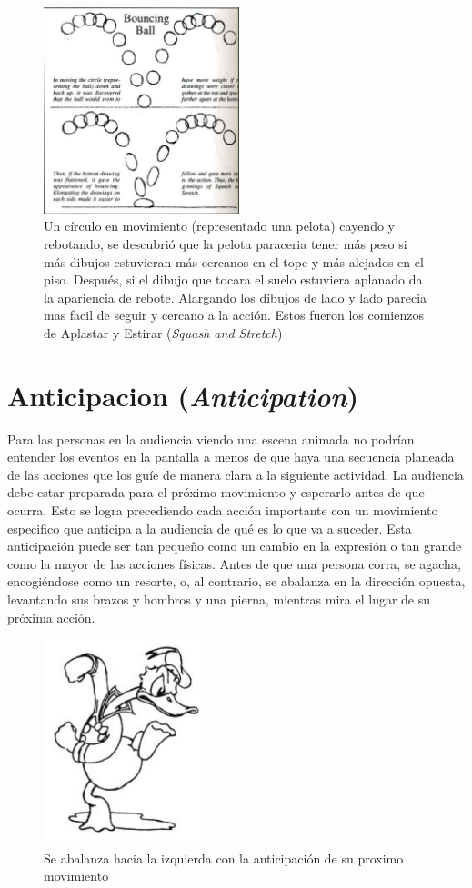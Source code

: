 \documentclass[a4paper,12pt]{report}
\begin{document}
 
\begin{figure}[ht]
    \centering
    \includegraphics[height=6cm]{Imagenes/bouncing_ball}
    \caption{Un círculo en movimiento (representado una pelota) cayendo y rebotando, se descubrió que la pelota paraceria
    tener más peso si más dibujos estuvieran más cercanos en el tope y más alejados en el piso. Después, si el dibujo que tocara el suelo estuviera aplanado
    da la apariencia de rebote. Alargando los dibujos de lado y lado parecia mas facil de seguir y cercano a la acción. Estos fueron los comienzos de
    Aplastar y Estirar (\textit{Squash and Stretch})}
    \label{fig:bouncy_ball}
\end{figure}
 
 
\section{Anticipacion (\textit{Anticipation}) }
 
 
Para las personas en la audiencia viendo una escena animada no podrían entender los eventos en la pantalla
a menos de que haya una secuencia planeada de las acciones que los guíe de manera clara a la siguiente actividad.
La audiencia debe estar preparada para el próximo movimiento y esperarlo antes de que ocurra. Esto se logra
precediendo cada acción importante con un movimiento especifico que anticipa a la audiencia
de qué es lo que va a suceder. Esta anticipación puede ser tan pequeño como un cambio en la expresión
o tan grande como la mayor de las acciones físicas. Antes de que una persona corra, se agacha, encogiéndose como un resorte,
o, al contrario, se abalanza en la dirección opuesta, levantando sus brazos y hombros y una pierna, mientras mira el lugar
de su próxima acción.\cite{principles_animation} 
 
 
\begin{figure}[!ht]
    \centering
    \includegraphics[height=6cm]{Imagenes/donald_anticipation}
    \caption{Se abalanza hacia la izquierda con la anticipación de su proximo movimiento}
    \label{fig:donald_anticipation}
\end{figure}
 
\end{document}
